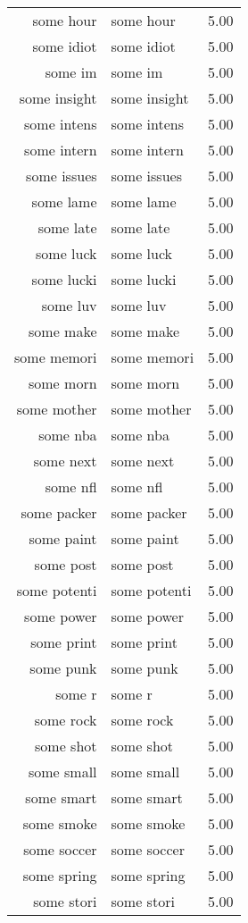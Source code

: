 \begin{table}[ht]
\begin{tabular}{rlr}
  some hour & some hour & 5.00 \\ 
  some idiot & some idiot & 5.00 \\ 
  some im & some im & 5.00 \\ 
  some insight & some insight & 5.00 \\ 
  some intens & some intens & 5.00 \\ 
  some intern & some intern & 5.00 \\ 
  some issues & some issues & 5.00 \\ 
  some lame & some lame & 5.00 \\ 
  some late & some late & 5.00 \\ 
  some luck & some luck & 5.00 \\ 
  some lucki & some lucki & 5.00 \\ 
  some luv & some luv & 5.00 \\ 
  some make & some make & 5.00 \\ 
  some memori & some memori & 5.00 \\ 
  some morn & some morn & 5.00 \\ 
  some mother & some mother & 5.00 \\ 
  some nba & some nba & 5.00 \\ 
  some next & some next & 5.00 \\ 
  some nfl & some nfl & 5.00 \\ 
  some packer & some packer & 5.00 \\ 
  some paint & some paint & 5.00 \\ 
  some post & some post & 5.00 \\ 
  some potenti & some potenti & 5.00 \\ 
  some power & some power & 5.00 \\ 
  some print & some print & 5.00 \\ 
  some punk & some punk & 5.00 \\ 
  some r & some r & 5.00 \\ 
  some rock & some rock & 5.00 \\ 
  some shot & some shot & 5.00 \\ 
  some small & some small & 5.00 \\ 
  some smart & some smart & 5.00 \\ 
  some smoke & some smoke & 5.00 \\ 
  some soccer & some soccer & 5.00 \\ 
  some spring & some spring & 5.00 \\ 
  some stori & some stori & 5.00 \\ 

\end{tabular}
\end{table}

